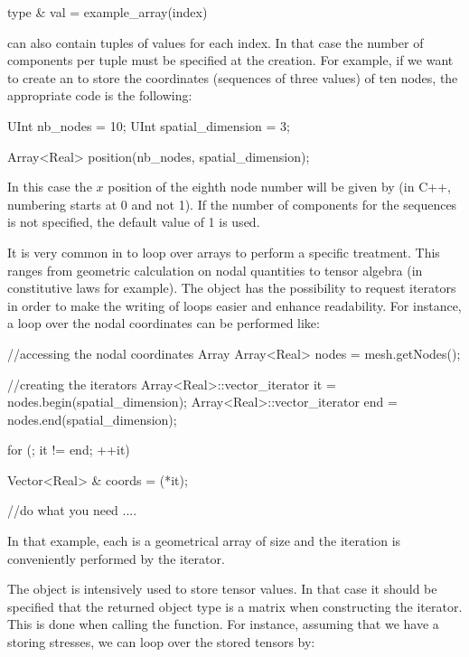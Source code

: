\begin{cpp}
  type & val = example_array(index)
\end{cpp}

 can also contain tuples of values for each
index. In that case the number of components per tuple must be
specified at the  creation.  For example, if we want to
create an  to store the coordinates (sequences of three
values) of ten nodes, the appropriate code is the following:
\begin{cpp}
  UInt nb_nodes = 10;
  UInt spatial_dimension = 3;

  Array<Real> position(nb_nodes, spatial_dimension);
\end{cpp}
In this case the $x$ position of the eighth node number will be given by
 (in C++, numbering starts at 0 and not
1). If the number of components for the sequences is not specified, the
default value of 1 is used.

It is very common in \akantu to loop over arrays to perform a specific
treatment. This ranges from geometric calculation on nodal quantities
to tensor algebra (in constitutive laws for example).
The  object has the possibility to request iterators
in order to make the writing of loops easier and enhance readability.
For instance, a loop over the nodal coordinates can be performed like:
\begin{cpp}
  //accessing the nodal coordinates Array
  Array<Real> nodes = mesh.getNodes();

  //creating the iterators
  Array<Real>::vector_iterator it  = nodes.begin(spatial_dimension);
  Array<Real>::vector_iterator end = nodes.end(spatial_dimension);

  for (; it != end; ++it){
    Vector<Real> & coords = (*it);

    //do what you need
    ....

  }
\end{cpp}
In that example, each  is a geometrical array of size 
and the iteration is conveniently performed by the  iterator.

The  object is intensively used to store tensor values.  In that
case it should be specified that the returned object type is a matrix when
constructing the iterator. This is done when calling the  function. For
instance, assuming that we have a  storing stresses, we can loop
over the stored tensors by:

